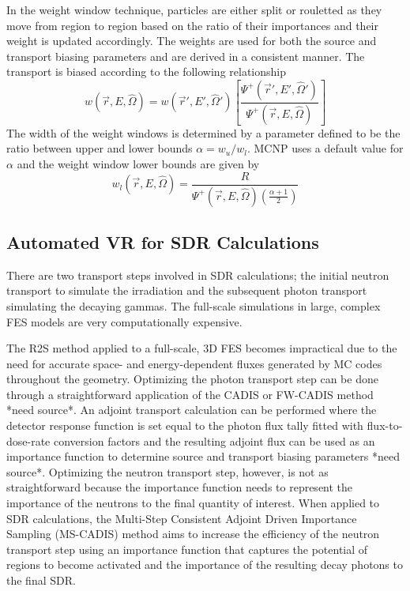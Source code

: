 In the weight window technique, particles are either split or
rouletted as they move from region to region based on the ratio of their
importances and their weight is updated accordingly.  
The weights are used for both the source and transport biasing parameters and
are derived %
in a consistent manner.  
The transport is biased according to the following relationship
\begin{equation} \label{eq:3.11}
	w(\overrightarrow{r}, E, \widehat{\Omega})=
	w(\overrightarrow{r}', E', \widehat{\Omega}')
	\left [ \frac{\Psi^{+}(\overrightarrow{r}', E', \widehat{\Omega}')}
	{\Psi^{+}(\overrightarrow{r}, E, \widehat{\Omega})} \right ]
\end{equation}
The width of the weight windows is determined by a parameter defined to be the
ratio between upper and lower bounds $\alpha =
w_{u}/w_{l}$.  MCNP uses a default value for $\alpha$ and the weight window lower
bounds are given by 
\begin{equation} \label{eq:3.12}
	w_{l}(\overrightarrow{r}, E, \widehat{\Omega}) = 
	\frac{R}{\Psi^{+}(\overrightarrow{r}, E, \widehat{\Omega})
	(\frac{\alpha + 1}{2})}
\end{equation}




\subsection{Automated VR for SDR Calculations}
There are two transport steps involved in SDR calculations; the initial
neutron transport to simulate the irradiation and the subsequent photon
transport simulating the decaying gammas.  The full-scale simulations in
large, complex FES models are very computationally expensive.

The R2S method applied to a full-scale, 3D FES becomes impractical due to the
need for accurate space- and energy-dependent fluxes generated by MC codes 
throughout the geometry.  Optimizing the photon transport step can be done
through a
straightforward application of the CADIS or FW-CADIS method *need source*.  An
adjoint transport calculation can be performed where the detector
response function  is set equal to the photon flux tally fitted with
flux-to-dose-rate conversion factors and the resulting adjoint flux can be used as an
importance function to determine source and transport biasing parameters *need
source*.  
Optimizing the neutron transport step, however, is not as
straightforward
because the importance function needs to represent the importance of the neutrons to the
final quantity of interest\cite{Ibrahim_2015}.
When applied to SDR calculations, the Multi-Step Consistent Adjoint Driven Importance Sampling (MS-CADIS) method
aims to increase the efficiency of the neutron transport step using an importance function
that captures the potential of regions to become activated and the importance of
the resulting decay photons to the final SDR\cite{Ibrahim_2015}.


